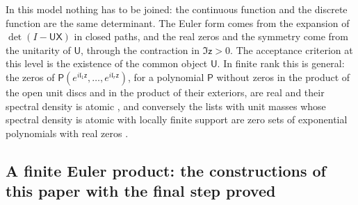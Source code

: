 \documentclass[11pt,reqno]{amsart}
\makeatletter
\let\CG@origcite\cite
\renewcommand*{\cite}[2][]{\def\CG@citekey{#2}%
  \ifx\relax#1\relax\CG@origcite{#2}\else\CG@origcite[#1]{#2}\fi}
\numberwithin{equation}{section}
\theoremstyle{plain}
\theoremstyle{definition}
\theoremstyle{remark}
\makeatother
\begin{document}
In this model nothing has to be joined: the continuous function and the discrete function are the same determinant.  The Euler form comes from the expansion of $\det(I-\mathsf U\mathsf X)$ in closed paths, and the real zeros and the symmetry come from the unitarity of $\mathsf U$, through the contraction in $\Im\mathsf z>0$.  The acceptance criterion at this level is the existence of the common object $\mathsf U$.  In finite rank this is general: the zeros of $\mathsf P(e^{i\mathfrak l_1\mathsf z},\dots,e^{i\mathfrak l_r\mathsf z})$, for a polynomial $\mathsf P$ without zeros in the product of the open unit discs and in the product of their exteriors, are real and their spectral density is atomic \cite{KurasovSarnak2020}, and conversely the lists with unit masses whose spectral density is atomic with locally finite support are zero sets of exponential polynomials with real zeros \cite{OlevskiiUlanovskii2020}.

\subsection{A finite Euler product: the constructions of this paper with the final step proved}
\label{subsec:finite-euler-model}
\end{document}
